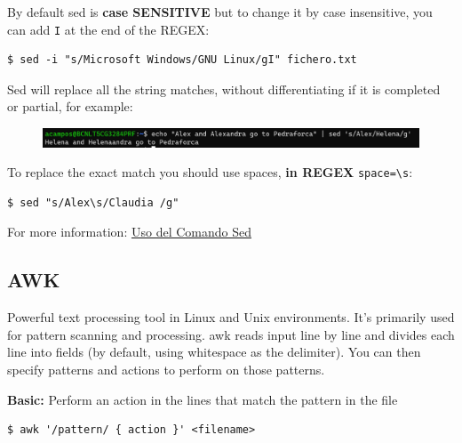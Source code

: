 \documentclass{article}
\newenvironment{blocktemplate}[1]{%
    \tcolorbox[beamer,%
    noparskip,breakable,
    colframe=Blue,%
    colbacklower=LimeGreen!75!LightGreen,%
    title=#1]}%
    {\endtcolorbox}
\newenvironment{blocktemplateIII}[1]{%
    \tcolorbox[beamer,%
    noparskip,breakable,
    ,colframe=Red,%
    colbacklower=LimeGreen!75!LightGreen,%
    title=#1]}%
    {\endtcolorbox}
\newenvironment{codetemplate}[1][]{%
  \mybasecolorbox[#1]
  \itshape
}{%
  \endmybasecolorbox
}
\begin{document}
\begin{blocktemplate}{NOTE}
By default sed is \textbf{case SENSITIVE} but to change it by case insensitive, you can add \verb|I| at the end of the REGEX:
 \begin{codetemplate}{}
\begin{verbatim}
$ sed -i "s/Microsoft Windows/GNU Linux/gI" fichero.txt
\end{verbatim}
\end{codetemplate}
\end{blocktemplate}

\begin{blocktemplateIII}{WARNING}
Sed will replace all the string matches, without differentiating if it is completed or partial, for example:
\begin{figure}[H]
    \includegraphics[width=\textwidth]{pictures/sed.png}
    \centering
\end{figure}

To replace the exact match you should use spaces, \textbf{in REGEX} \verb|space=\s|:
\begin{codetemplate}{}
\begin{verbatim}
$ sed "s/Alex\s/Claudia /g"
\end{verbatim}
\end{codetemplate}
\end{blocktemplateIII}

For more information:
\href{https://www.ochobitshacenunbyte.com/2019/05/28/uso-del-comando-sed-en-linux-y-unix-con-ejemplos/}{Uso del Comando Sed} 

\subsection{AWK}
Powerful text processing tool in Linux and Unix environments. It's primarily used for pattern scanning and processing. awk reads input line by line and divides each line into fields (by default, using whitespace as the delimiter). You can then specify patterns and actions to perform on those patterns.

\textbf{Basic:} Perform an action in the lines that match the pattern in the file
\begin{codetemplate}{}
\begin{verbatim}
$ awk '/pattern/ { action }' <filename>
\end{verbatim}
\end{codetemplate}
\end{document}
